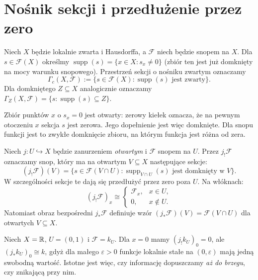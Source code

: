 \section{Nośnik sekcji i przedłużenie przez zero}
\begin{definicja}
\label{def:gamma-c-v12}
Niech $X$ będzie lokalnie zwarta i Hausdorffa, a $\mathcal F$
niech będzie snopem na $X$. Dla $s\in\mathcal F(X)$ określmy
$\operatorname{supp}(s)=\{x\in X:s_x\ne0\}$
(zbiór ten jest już domknięty na mocy warunku snopowego).
Przestrzeń sekcji o nośniku zwartym oznaczamy
\[\Gamma_c(X,\mathcal F)
  :=\{s\in\mathcal F(X):\operatorname{supp}(s)\text{ jest zwarty}\}.\]
Dla domkniętego $Z\subseteq X$ analogicznie oznaczamy
$\Gamma_Z(X,\mathcal F)=\{s:\operatorname{supp}(s)\subseteq Z\}$.
\end{definicja}

\begin{uwaga}
Zbiór punktów $x$ o $s_x=0$ jest otwarty: zerowy kiełek oznacza,
że na pewnym otoczeniu $x$ sekcja $s$ jest zerowa. Jego dopełnienie
jest więc domknięte. Dla snopu funkcji jest to zwykłe domknięcie
zbioru, na którym funkcja jest różna od zera.
\end{uwaga}

\begin{definicja}
\label{def:jbang-v12}
Niech $j:U\hookrightarrow X$ będzie zanurzeniem \emph{otwartym}
i $\mathcal F$ snopem na $U$. Przez $j_!\mathcal F$ oznaczamy snop,
który ma na otwartym $V\subseteq X$ następujące sekcje:
\[(j_!\mathcal F)(V)=\{s\in\mathcal F(V\cap U):
\operatorname{supp}_{V\cap U}(s)\text{ jest domknięty w }V\}.\]
W szczególności sekcje te dają się przedłużyć przez zero
poza $U$. Na włóknach:
\[
(j_!\mathcal F)_x\cong
\begin{cases}\mathcal F_x,&x\in U,\\0,&x\notin U.\end{cases}
\]
Natomiast obraz bezpośredni $j_*\mathcal F$ definiuje wzór
$(j_*\mathcal F)(V)=\mathcal F(V\cap U)$ dla otwartych $V\subseteq X$.
\end{definicja}

\begin{przyklad}
Niech $X=\mathbb{R}$, $U=(0,1)$ i $\mathcal F=k_U$. Dla $x=0$ mamy
$(j_!k_U)_0=0$, ale $(j_*k_U)_0\cong k$, gdyż dla małego
$\varepsilon>0$ funkcje lokalnie stałe na $(0,\varepsilon)$
mają jedną swobodną wartość. Istotne jest więc, czy
informację dopuszczamy \emph{aż do brzegu}, czy znikającą przy nim.
\end{przyklad}

